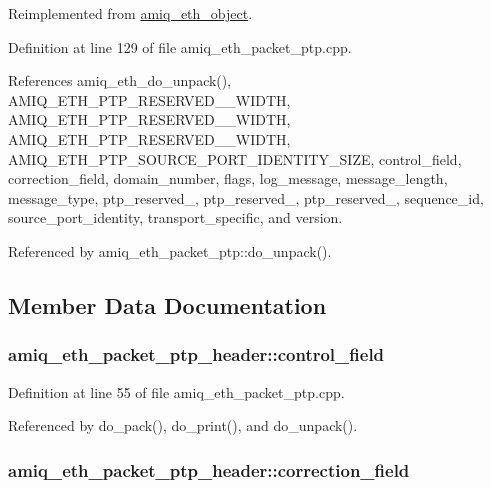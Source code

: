 Reimplemented from \hyperlink{classamiq__eth__object_aaa82659e656422df7dcf2cce578fc7d7}{amiq\_\-eth\_\-object}.

Definition at line 129 of file amiq\_\-eth\_\-packet\_\-ptp.cpp.

References amiq\_\-eth\_\-do\_\-unpack(), AMIQ\_\-ETH\_\-PTP\_\-RESERVED\_\_\-WIDTH, AMIQ\_\-ETH\_\-PTP\_\-RESERVED\_\_\-WIDTH, AMIQ\_\-ETH\_\-PTP\_\-RESERVED\_\_\-WIDTH, AMIQ\_\-ETH\_\-PTP\_\-SOURCE\_\-PORT\_\-IDENTITY\_\-SIZE, control\_\-field, correction\_\-field, domain\_\-number, flags, log\_\-message, message\_\-length, message\_\-type, ptp\_\-reserved\_, ptp\_\-reserved\_, ptp\_\-reserved\_, sequence\_\-id, source\_\-port\_\-identity, transport\_\-specific, and version.

Referenced by amiq\_\-eth\_\-packet\_\-ptp::do\_\-unpack().

\subsection{Member Data Documentation}
\hypertarget{classamiq__eth__packet__ptp__header_a0ac39ffa7e8fccfebafd2ed81188e3ee}{
\subsubsection[{control\_\-field}]{ {\bf amiq\_\-eth\_\-packet\_\-ptp\_\-header::control\_\-field}}}
\label{classamiq__eth__packet__ptp__header_a0ac39ffa7e8fccfebafd2ed81188e3ee}


Definition at line 55 of file amiq\_\-eth\_\-packet\_\-ptp.cpp.

Referenced by do\_\-pack(), do\_\-print(), and do\_\-unpack().\hypertarget{classamiq__eth__packet__ptp__header_ac985b496e7edef0abbb81b23f5a2d585}{
\subsubsection[{correction\_\-field}]{ {\bf amiq\_\-eth\_\-packet\_\-ptp\_\-header::correction\_\-field}}}
\label{classamiq__eth__packet__ptp__header_ac985b496e7edef0abbb81b23f5a2d585}


